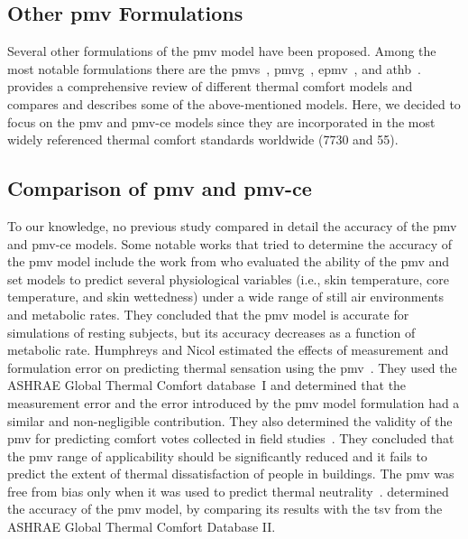\subsection{Other \ac{pmv} Formulations}\label{subsec:other-pmv-formulations}
Several other formulations of the \ac{pmv} model have been proposed.
Among the most notable formulations there are the \ac{pmvs}~\cite{GaggeSET}, \ac{pmvg}~\cite{GaggeSET}, \ac{epmv}~\cite{Toftum2002}, and \ac{athb}~\cite{Schweiker2022}.
 provides a comprehensive review of different thermal comfort models and compares and describes some of the above-mentioned models.
Here, we decided to focus on the \ac{pmv} and \ac{pmv-ce} models since they are incorporated in the most widely referenced thermal comfort standards worldwide (\gls{7730} and \gls{55}).

\subsection{Comparison of \ac{pmv} and \ac{pmv-ce}}\label{subsec:comparision-of-pmv-formulations}
To our knowledge, no previous study compared in detail the accuracy of the \ac{pmv} and \ac{pmv-ce} models.
Some notable works that tried to determine the accuracy of the \ac{pmv} model include the work from  who evaluated the ability of the \ac{pmv} and \ac{set} models to predict several physiological variables (i.e., skin temperature, core temperature, and skin wettedness) under a wide range of still air environments and metabolic rates.
They concluded that the \ac{pmv} model is accurate for simulations of resting subjects, but its accuracy decreases as a function of metabolic rate.
Humphreys and Nicol estimated the effects of measurement and formulation error on predicting thermal sensation using the \ac{pmv}~\cite{Humphreys2000}.
They used the ASHRAE Global Thermal Comfort database~I and determined that the measurement error and the error introduced by the \ac{pmv} model formulation had a similar and non-negligible contribution.
They also determined the validity of the \ac{pmv} for predicting comfort votes collected in field studies~\cite{Humphreys2002}.
They concluded that the \ac{pmv} range of applicability should be significantly reduced and it fails to predict the extent of thermal dissatisfaction of people in buildings.
The \ac{pmv} was free from bias only when it was used to predict thermal neutrality~\cite{Humphreys2002}.
 determined the accuracy of the \ac{pmv} model, by comparing its results with the \ac{tsv} from the ASHRAE Global Thermal Comfort Database II.
